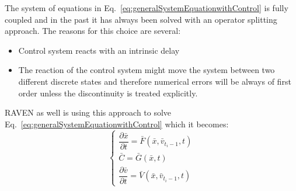 \documentclass{mc2013}
\begin{document}
\label{sec:operatorSplitting}

The system of equations in Eq.~\ref{eq:generalSystemEquationwithControl} is fully coupled and in the past it has always been solved with an operator splitting approach. The reasons for this choice are several:
\begin{itemize}
\item Control system reacts with an intrinsic delay
\item The reaction of the control system might move the system between two different discrete states and
therefore numerical errors will be always of first order unless the discontinuity is treated explicitly.
\end{itemize}
RAVEN as well is using this approach to solve Eq.~\ref{eq:generalSystemEquationwithControl} which it becomes:
\begin{equation}
\begin{cases} 
\dfrac{\partial \bar{x}}{\partial t} = \bar{F}(\bar{x},\bar{v}_{t_{i}-1},t) \\
\bar{C} = \bar{G}(\bar{x},t) \\ 
\dfrac{\partial \bar{v}}{\partial t} = \bar{V}(\bar{x},\bar{v}_{t_{i}-1},t) 
\end{cases}
\label{eq:generalSystemEquationwithControlSplitting}
\end{equation}
\end{document}
